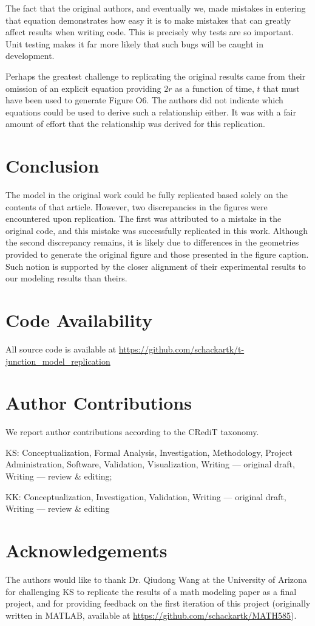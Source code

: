 The fact that the original authors, and eventually we, made mistakes in entering that equation
demonstrates how easy it is to make mistakes that can greatly affect results when writing code.
This is precisely why tests are so important. Unit testing makes it far more likely that
such bugs will be caught in development.

Perhaps the greatest challenge to replicating the original results came from their
omission of an explicit equation providing $2r$ as a function of time, $t$ that must have been
used to generate Figure O6. The authors did not indicate which equations could be used to
derive such a relationship either. It was with a fair amount of effort that the relationship
was derived for this replication.

\section{Conclusion}

The model in the original work could be fully replicated based solely on the contents of
that article. However, two discrepancies in the figures were encountered upon replication.
The first was attributed to a mistake in the original code, and this mistake was successfully
replicated in this work. Although the second discrepancy remains, it is likely due to differences
in the geometries provided to generate the original figure and those presented in the figure caption.
Such notion is supported by the closer alignment of their experimental results to our modeling results
than theirs.

\section{Code Availability}

All source code is available at \url{https://github.com/schackartk/t-junction_model_replication}

\section{Author Contributions}

We report author contributions according to the CRediT taxonomy\supercite{allen_how_2019}.

KS: Conceptualization, Formal Analysis, Investigation, Methodology,
Project Administration, Software, Validation, Visualization, Writing — original draft,
Writing — review \& editing;

KK: Conceptualization, Investigation, Validation, Writing — original draft,
Writing — review \& editing

\section{Acknowledgements}

The authors would like to thank Dr. Qiudong Wang at the University of Arizona for
challenging KS to replicate the results of a math modeling paper as a final project, and
for providing feedback on the first iteration of this project (originally written
in MATLAB, available at \url{https://github.com/schackartk/MATH585}).



